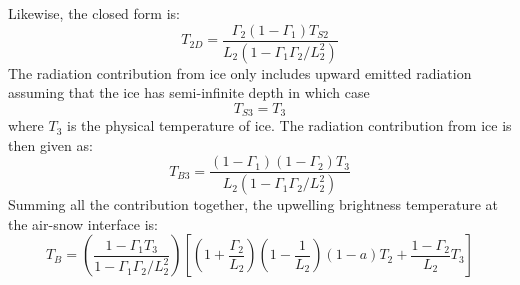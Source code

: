 Likewise, the closed form is:
\begin{equation*}
  T_{2D} = \frac{\Gamma_2(1-\Gamma_1)T_{S2}}{L_2(1-\Gamma_1\Gamma_2/L_2^2)}
\end{equation*}
The radiation contribution from ice only includes upward emitted radiation assuming that the ice has semi-infinite depth in which case
\begin{equation*}
  T_{S3} = T_3
\end{equation*}
where $T_3$ is the physical temperature of ice.
The radiation contribution from ice is then given as:
\begin{equation*}
  T_{B3}=\frac{(1-\Gamma_1)(1-\Gamma_2)T_3}{L_2(1-\Gamma_1\Gamma_2/L_2^2)}
\end{equation*}
Summing all the contribution together, the upwelling brightness temperature at the air-snow interface is:
\begin{equation*}
  T_B=\left(\frac{1-\Gamma_1T_3}{1-\Gamma_1\Gamma_2/L_2^2}\right)\left[\left(1+\frac{\Gamma_2}{L_2}\right)\left(1-\frac{1}{L_2}\right)(1-a)T_2+\frac{1-\Gamma_2}{L_2}T_3\right]
\end{equation*}
